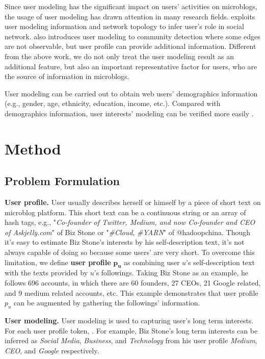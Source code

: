\documentclass[runningheads,a4paper]{llncs}
\begin{document}
Since user modeling has the significant impact on users' activities on microblogs, the usage of user modeling has drawn attention in many research fields. 
\cite{zhao2013inferring} exploits user modeling information and network topology to infer user's role in social network.
\cite{yoshida2013toward} also introduces user modeling to community detection where some edges are not observable, but user profile can provide additional information.
Different from the above work, we do not only treat the user modeling result as an additional feature, but also an important representative factor for users, who are the source of information in microblogs.

User modeling can be carried out to obtain web users' demographics information \cite{culotta2015predicting} (e.g., gender, age, ethnicity, education, income, etc.).
Compared with demographics information, user interests' modeling can be verified more easily \cite{faralli2015large}. 

\section{Method}
\subsection{Problem Formulation}
\textbf{User profile.} User usually describes herself or himself by a piece of short text on microblog platform.
This short text can be a continuous string or an array of hash tags, e.g., "\textit{Co-founder of Twitter, Medium, and now Co-founder and CEO of Askjelly.com}" of Biz Stone or "\textit{\#Cloud}, \textit{\#YARN}" of @hadoopchina.
Though it's easy to estimate Biz Stone's interests by his self-description text, it's not always capable of doing so because some users' are very short.
To overcome this limitation, we define \textbf{user profile} \(\bm{p_u}\) as combining user \(u\)'s self-description text with the texts provided by \(u\)'s followings. 
Taking Biz Stone as an example, he follows 696 accounts, in which there are 60 founders, 27 CEOs, 21 Google related, and 9 medium related accounts, etc. 
This example demonstrates that user profile \(p_u\) can be augmented by gathering the followings' information.

\textbf{User modeling.} 
User modeling is used to capturing user's long term interests. 
For each user profile token, .
For example, Biz Stone's long term interests can be inferred as \textit{Social Media}, \textit{Business}, and \textit{Technology} from his user profile \textit{Medium}, \textit{CEO}, and \textit{Google} respectively.
\end{document}
